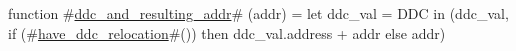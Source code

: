function #\hyperref[sailRISCVzddczyandzyresultingzyaddr]{ddc\_and\_resulting\_addr}# (addr) = {
  let ddc_val = DDC in
  (ddc_val, if (#\hyperref[sailRISCVzhavezyddczyrelocation]{have\_ddc\_relocation}#()) then ddc_val.address + addr else addr)
}
